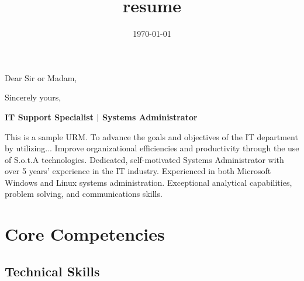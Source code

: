 \documentclass[10pt,letterpaper,sans]{moderncv} %
\title{resume}
\begin{document}


\clearpage

\date{\today} %
\opening{Dear Sir or Madam,} %
\closing{Sincerely yours,} %

\makelettertitle %

\lipsum[1-2] %
\lipsum[4] %

\makeletterclosing %

\newpage


\makecvtitle %



\begin{center}
	\textbf{IT Support Specialist | Systems Administrator}\\
\end{center}

This is a sample URM. To advance the goals and objectives of the IT department by utilizing... Improve organizational efficiencies and productivity through the use of S.o.t.A technologies. Dedicated, self-motivated Systems Administrator with over 5 years' experience in the IT industry. Experienced in both Microsoft Windows and Linux systems administration. Exceptional analytical capabilities, problem solving, and communications skills.

\section{Core Competencies}
\subsection{Technical Skills}
\end{document}
